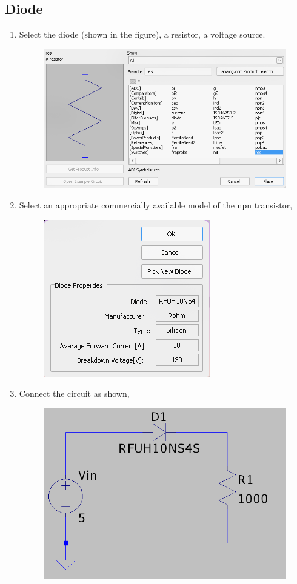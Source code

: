 \documentclass[12pt,a4paper]{report}
\begin{document}
\subsection{Diode}
\begin{enumerate}
    \item Select the diode (shown in the figure), a resistor, a voltage source.
    \begin{figure}[h!]
        \centering
        \includegraphics[width = 0.6\linewidth]{Simluations/Experiment_1/figs/component-diode.png}
        \label{fig:placeholder}
    \end{figure}
    \item Select an appropriate commercially available model of the npn transistor,
    \begin{figure}[h!]
        \centering
        \includegraphics[width=0.3\linewidth]{Simluations/Experiment_1/figs/diode-model.png}
        \label{fig:placeholder}
    \end{figure}
    \item Connect the circuit as shown,
    \begin{figure}[h!]
        \centering
        \includegraphics[width=0.5\linewidth]{Simluations/Experiment_1/figs/diode-circuit.png}

\end{figure}
\end{enumerate}
\end{document}
